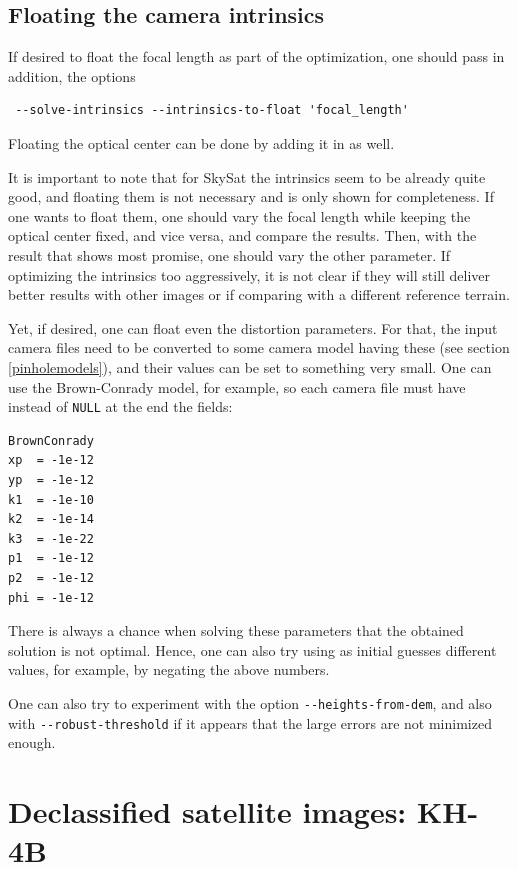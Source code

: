 \subsection{Floating the camera intrinsics}

If desired to float the focal length as part of the optimization, one should 
pass in addition, the options
\begin{verbatim}
 --solve-intrinsics --intrinsics-to-float 'focal_length'
\end{verbatim}
Floating the optical center can be done by adding it in as well. 

It is important to note that for SkySat the intrinsics seem to be already quite good,
and floating them is not necessary and is only shown for completeness. If 
one wants to float them, one should vary the focal length while keeping the optical center
fixed, and vice versa, and compare the results. Then, with the result that shows most
promise, one should vary the other parameter. If optimizing the intrinsics too aggressively,
it is not clear if they will still deliver better results with other images or 
if comparing with a different reference terrain. 

Yet, if desired, one can float even the distortion parameters. 
For that, the input camera files need to be converted
to some camera model having these (see section \ref{pinholemodels}), 
and their values can be set to something very small.
One can use the Brown-Conrady model, for example, so each camera file must have
instead of \texttt{NULL} at the end the fields:
\begin{verbatim}
BrownConrady
xp  = -1e-12
yp  = -1e-12
k1  = -1e-10
k2  = -1e-14
k3  = -1e-22
p1  = -1e-12
p2  = -1e-12
phi = -1e-12
\end{verbatim}

There is always a chance when solving these parameters that the obtained solution is not optimal.
Hence, one can also try using as initial guesses different values, for example, 
by negating the above numbers. 

One can also try to experiment with the option \texttt{-\/-heights-from-dem}, and also with \texttt{-\/-robust-threshold} if it appears that the large errors are not minimized enough.

\section{Declassified satellite images: KH-4B}
\label{kh4}

